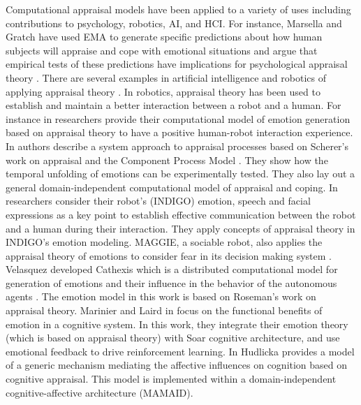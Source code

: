 \documentclass[12pt]{report}
\begin{document}
Computational appraisal models have been applied to a variety of uses including
contributions to psychology, robotics, AI, and HCI. For instance, Marsella and
Gratch have used EMA \cite{marsella:ema-process-model} to generate specific
predictions about how human subjects will appraise and cope with emotional
situations and argue that empirical tests of these predictions have implications
for psychological appraisal theory \cite{gratch:assessing-appraisal}
\cite{marsella:assessing-coping}. There are several examples in artificial
intelligence and robotics of applying appraisal theory
\cite{adam:bdi-emotional-companion} \cite{kim:model-hri-appraisal}
\cite{marsella:ema-process-model}. In robotics, appraisal theory has been used
to establish and maintain a better interaction between a robot and a human. For
instance in \cite{kim:model-hri-appraisal} researchers provide their
computational model of emotion generation based on appraisal theory to have a
positive human-robot interaction experience. In
\cite{sander:systems-approach-appraisal} authors describe a system approach to
appraisal processes based on Scherer's work on appraisal and the Component
Process Model \cite{scherer:nature-function-emotion}. They show how the
temporal unfolding of emotions can be experimentally tested. They also lay out a
general domain-independent computational model of appraisal and coping. In
\cite{vogiatzis:robot-museum} researchers consider their robot's (INDIGO)
emotion, speech and facial expressions as a key point to establish effective
communication between the robot and a human during their interaction. They apply
concepts of appraisal theory in INDIGO's emotion modeling. MAGGIE, a sociable
robot, also applies the appraisal theory of emotions to consider fear in its
decision making system \cite{castro:autonomous-robot-fear}. Velasquez developed
Cathexis which is a distributed computational model for generation of emotions
and their influence in the behavior of the autonomous agents
\cite{velasquez:emotions-motivations-agents}. The emotion model in this work is
based on Roseman's work on appraisal theory. Marinier and Laird in
\cite{marinier:emotion-reinforcement} focus on the functional benefits of
emotion in a cognitive system. In this work, they integrate their emotion theory
(which is based on appraisal theory) with Soar cognitive architecture, and use
emotional feedback to drive reinforcement learning. In
\cite{hudlicka:emotinos-reasons} Hudlicka provides a model of a generic
mechanism mediating the affective influences on cognition based on cognitive
appraisal. This model is implemented within a domain-independent
cognitive-affective architecture (MAMAID).
\end{document}
